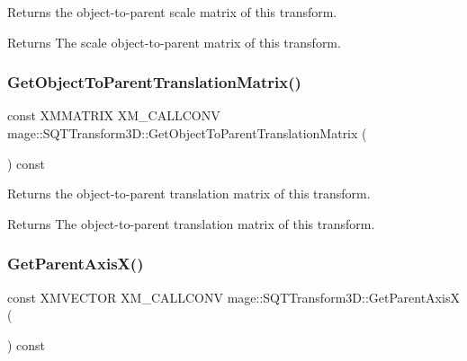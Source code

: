 Returns the object-\/to-\/parent scale matrix of this transform.

\begin{DoxyReturn}{Returns}
The scale object-\/to-\/parent matrix of this transform. 
\end{DoxyReturn}
\mbox{\label{classmage_1_1_s_q_t_transform3_d_abe11b979bf042a36c95b5e90c22fcd5d}} 
\subsubsection{\texorpdfstring{Get\+Object\+To\+Parent\+Translation\+Matrix()}{GetObjectToParentTranslationMatrix()}}
{\footnotesize\ttfamily const X\+M\+M\+A\+T\+R\+IX X\+M\+\_\+\+C\+A\+L\+L\+C\+O\+NV mage\+::\+S\+Q\+T\+Transform3\+D\+::\+Get\+Object\+To\+Parent\+Translation\+Matrix (\begin{DoxyParamCaption}{ }\end{DoxyParamCaption}) const\hspace{0.3cm}{\ttfamily [noexcept]}}

Returns the object-\/to-\/parent translation matrix of this transform.

\begin{DoxyReturn}{Returns}
The object-\/to-\/parent translation matrix of this transform. 
\end{DoxyReturn}
\mbox{\label{classmage_1_1_s_q_t_transform3_d_a5840221311ae851bf80279f355a5fe49}} 
\subsubsection{\texorpdfstring{Get\+Parent\+Axis\+X()}{GetParentAxisX()}}
{\footnotesize\ttfamily const X\+M\+V\+E\+C\+T\+OR X\+M\+\_\+\+C\+A\+L\+L\+C\+O\+NV mage\+::\+S\+Q\+T\+Transform3\+D\+::\+Get\+Parent\+AxisX (\begin{DoxyParamCaption}{ }\end{DoxyParamCaption}) const\hspace{0.3cm}{\ttfamily [noexcept]}}

